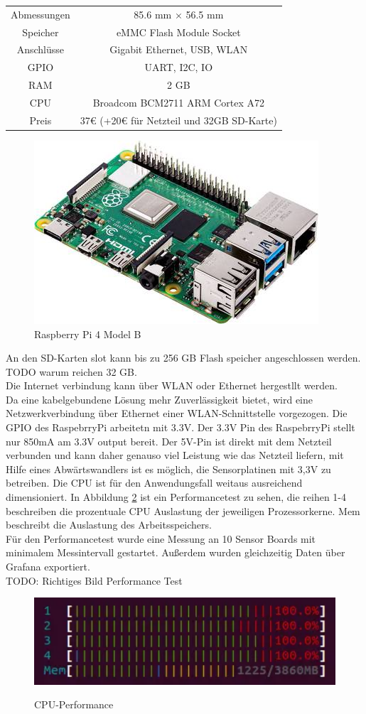 \begin{center}
\begin{tabular}{ c c }
 Abmessungen & 85.6 mm × 56.5 mm \\ 
 Speicher & eMMC Flash Module Socket \\  
 Anschlüsse & Gigabit Ethernet, USB, WLAN \\  
 GPIO & UART, I2C, IO \\  
 RAM & 2 GB \\  
 CPU & Broadcom BCM2711 ARM Cortex A72 \\  
 Preis & 37€ (+20€ für Netzteil und 32GB SD-Karte)  
\end{tabular}
\end{center}
\begin{figure}[H]
  \centering
 \includegraphics[width=0.5\linewidth]{img/Raspberry-Pi-4-Model-B}
  \caption{Raspberry Pi 4 Model B}
  \label{fig:Raspberry_Pi_4_Model_B}
\end{figure}
An den SD-Karten slot kann bis zu 256 GB Flash speicher angeschlossen werden.
TODO warum reichen 32 GB.\\
Die Internet verbindung kann über WLAN oder Ethernet hergestllt werden.\\
Da eine kabelgebundene Lösung mehr Zuverlässigkeit bietet, wird eine Netzwerkverbindung über Ethernet einer WLAN-Schnittstelle vorgezogen. 
Die GPIO des RaspebrryPi arbeitetn mit 3.3V.
Der 3.3V Pin des RaspebrryPi stellt nur 850mA am 3.3V output bereit.
Der 5V-Pin ist direkt mit dem Netzteil verbunden und kann daher genauso viel Leistung wie das Netzteil liefern, mit Hilfe eines Abwärtswandlers ist es möglich, die Sensorplatinen mit 3,3V zu betreiben.
Die CPU ist für den Anwendungsfall weitaus ausreichend dimensioniert.
In Abbildung \ref{fig:CPU-Performance} ist ein Performancetest zu sehen, die reihen 1-4 beschreiben die prozentuale CPU Auslastung der jeweiligen Prozessorkerne.
Mem beschreibt die Auslastung des Arbeitsspeichers.\\
Für den Performancetest wurde eine Messung an 10 Sensor Boards mit minimalem Messintervall gestartet.
Außerdem wurden gleichzeitig Daten über Grafana exportiert.\\
TODO: Richtiges Bild Performance Test\\
\begin{figure}[H]
  \centering
  \caption{CPU-Performance}
 \includegraphics[width=0.7\linewidth]{img/CPU-Performance.png}
  \label{fig:CPU-Performance}
\end{figure}

